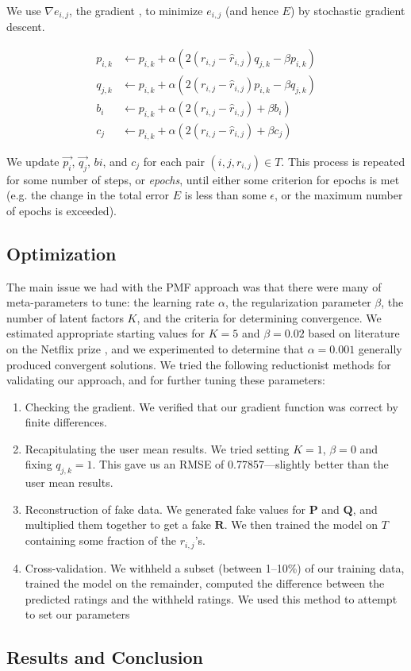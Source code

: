 \documentclass[11pt]{amsart}
\newcommand{\mat}[1]{\mathbf{#1}}
\begin{document}
We use $\nabla e_{i,j}$, the gradient , to minimize $e_{i,j}$ (and hence $E$) by stochastic gradient descent.

\begin{align*}
p_{i,k} &\gets p_{i,k} + \alpha \left(2 \left(r_{i,j} - \hat{r}_{i,j}\right)  q_{j,k} - \beta p_{i,k} \right) \\
q_{j,k} &\gets p_{i,k} + \alpha \left(2 \left(r_{i,j} - \hat{r}_{i,j}\right)  p_{i,k} - \beta q_{j,k} \right) \\
b_{i}   &\gets p_{i,k} + \alpha \left(2 \left(r_{i,j} - \hat{r}_{i,j}\right)          + \beta b_{i}   \right) \\
c_{j}   &\gets p_{i,k} + \alpha \left(2 \left(r_{i,j} - \hat{r}_{i,j}\right)          + \beta c_{j}   \right)
\end{align*}

We update $\vec{p_i}$, $\vec{q_j}$, $b{i}$, and $c_{j}$ for each pair $(i, j, r_{i,j}) \in T$. This process is repeated for some number of steps, or \emph{epochs}, until either some criterion for epochs is met (e.g. the change in the total error $E$ is less than some $\epsilon$, or the maximum number of epochs is exceeded). 

\subsection{Optimization}
The main issue we had with the PMF approach was that there were many of meta-parameters to tune: the learning rate $\alpha$, the regularization parameter $\beta$, the number of latent factors $K$, and the criteria for determining convergence. We estimated appropriate starting values for $K = 5$ and $\beta = 0.02$ based on literature on the Netflix prize \cite{Mnih:2007wg,Ott:2008tu}, and we experimented to determine that $\alpha = 0.001$ generally produced convergent solutions. We tried the following reductionist methods for validating our approach, and for further tuning these parameters:

\begin{enumerate}
\item Checking the gradient. We verified that our gradient function was correct by finite differences.
\item Recapitulating the user mean results. We tried setting $K=1$, $\beta=0$ and fixing $q_{j,k} = 1$. This gave us an RMSE of 0.77857---slightly better than the user mean results.
\item Reconstruction of fake data. We generated fake values for $\mat{P}$ and $\mat{Q}$, and multiplied them together to get a fake $\mat{R}$. We then trained the model on $T$ containing some fraction of the $r_{i,j}$'s.  
\item Cross-validation. We withheld a subset (between 1--10\%) of our training data, trained the model on the remainder, computed the difference between the predicted ratings and the withheld ratings. We used this method to attempt to set our parameters
 
\end{enumerate}

\subsection{Results and Conclusion}




\end{document}
